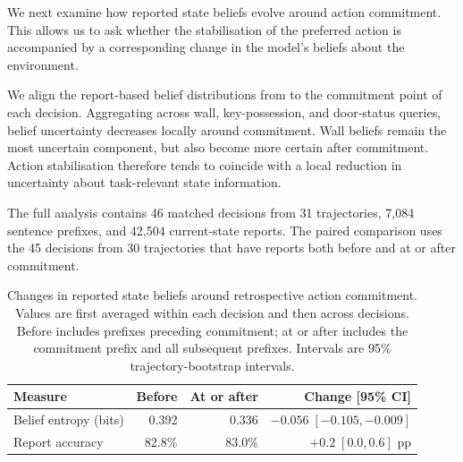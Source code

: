 \documentclass{article}
\begin{document}
We next examine how reported state beliefs evolve around action commitment.
This allows us to ask whether the stabilisation of the preferred action is
accompanied by a corresponding change in the model's beliefs about the
environment.

We align the report-based belief distributions from
 to the commitment point of each decision.
Aggregating across wall, key-possession, and door-status queries, belief
uncertainty decreases locally around commitment. Wall beliefs remain the most
uncertain component, but also become more certain after commitment. Action
stabilisation therefore tends to coincide with a local reduction in
uncertainty about task-relevant state information.



The full analysis contains 46 matched decisions from 31 trajectories, 7,084
sentence prefixes, and 42,504 current-state reports. The paired comparison
uses the 45 decisions from 30 trajectories that have reports both before and
at or after commitment.

\begin{table}[t]
\centering
\small
\begin{tabular}{lrrr}
\toprule
Measure & Before & At or after & Change [95\% CI] \\
\midrule
Belief entropy (bits)
    & 0.392 & 0.336 & $-0.056\;[-0.105,-0.009]$ \\
Report accuracy
    & 82.8\% & 83.0\% & $+0.2\;[0.0,0.6]$ pp \\
\bottomrule
\end{tabular}
\caption{Changes in reported state beliefs around retrospective action
commitment. Values are first averaged within each decision and then across
decisions. Before includes prefixes preceding commitment; at or after includes
the commitment prefix and all subsequent prefixes. Intervals are 95\%
trajectory-bootstrap intervals.}
\label{tab:belief-commitment-changes}
\end{table}
\end{document}
